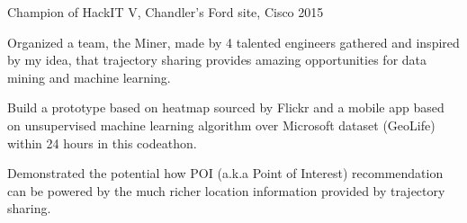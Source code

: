 
\begin{cventries}
  \cventryXx
    {Champion of HackIT V, Chandler's Ford site, Cisco}
    {2015}
    {
      \begin{cvitems}
        \item {Organized a team, the Miner, made by 4 talented engineers gathered and inspired by my idea, that trajectory sharing provides amazing opportunities for data mining and machine learning.}
        \item {Build a prototype based on heatmap sourced by Flickr and a mobile app based on unsupervised machine learning algorithm over Microsoft dataset (GeoLife) within 24 hours in this codeathon.}
        \item{Demonstrated the potential how POI (a.k.a Point of Interest) recommendation can be powered by the much richer location information provided by trajectory sharing.}
      \end{cvitems}
    }
\end{cventries}
